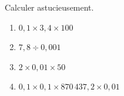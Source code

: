 \documentclass[exercice]{thedocument}%
\begin{document}
%
Calculer astucieusement.
\begin{enumerate}
    \item $0,1\times3,4\times100$
    \item $7,8\div0,001$
    \item $2\times0,01\times50$
    \item $0,1\times0,1\times870\,437,2\times0,01$
\end{enumerate}
\end{document}
